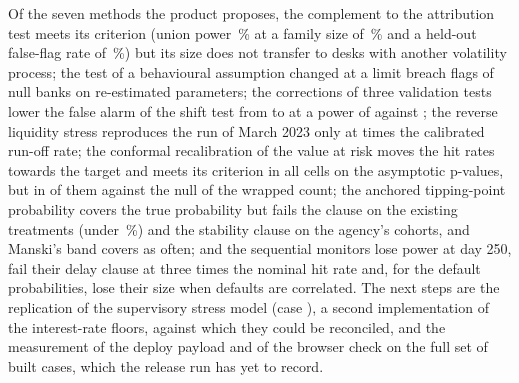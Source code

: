 Of the seven methods the product proposes, the complement to the attribution test meets its criterion (union power \pxThirteenUnionPower{}\,\% at a family size of \pxThirteenSize{}\,\% and a held-out false-flag rate of \pxThirteenNullUnion{}\,\%) but its size does not transfer to desks with another volatility process; the test of a behavioural assumption changed at a limit breach flags \pxPpEightFitNull{} of null banks on re-estimated parameters; the corrections of three validation tests lower the false alarm of the shift test from \pxPpTenFixedFive{} to \pxPpTenPerm{} at a power of \pxPpTenPermPower{} against \pxPpTenFixedPower{}; the reverse liquidity stress reproduces the run of March 2023 only at \pxPpElevenSvbMult{} times the calibrated run-off rate; the conformal recalibration of the value at risk moves the hit rates towards the target and meets its criterion in all \pxSixteenCells{} cells on the asymptotic p-values, but in \pxPpSixteenHoneGain{} of them against the null of the wrapped count; the anchored tipping-point probability covers the true probability but fails the clause on the existing treatments (under \pxFourteenExistingTarget{}\,\%) and the stability clause on the agency's cohorts, and Manski's band covers as often; and the sequential monitors lose power at day 250, fail their delay clause at three times the nominal hit rate and, for the default probabilities, lose their size when defaults are correlated. The next steps are the replication of the supervisory stress model (case \rsCaseNoResult{}), a second implementation of the interest-rate floors, against which they could be reconciled, and the measurement of the deploy payload and of the browser check on the full set of built cases, which the release run has yet to record.
